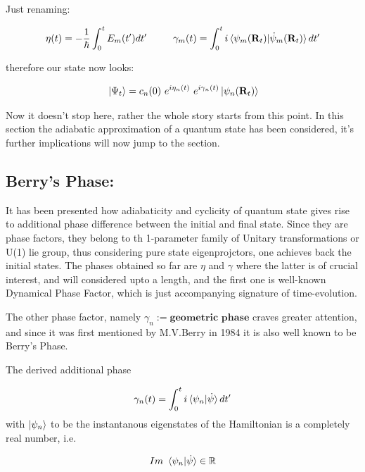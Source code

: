 \documentclass[8pt, twocoloumn]{article}
\begin{document}
Just renaming:

\begin{align}
\eta(t)=-\frac{1}{\hbar} \int^{t}_{0}E_m(t')dt'  \ \ \ \ \ \ \ \  \gamma_m(t)=\int^{t}_{0}i\braket{\psi_m(\textbf{R}_t)|\dot{\psi}_m(\textbf{R}_t)}dt'
\end{align}

therefore our state now looks: 

\begin{align}{\label{state}}
\ket{\Psi_t}=c_n(0) \ e^{i\eta_n(t)}\ e ^{i\gamma_n(t)} \ket{\psi_n(\textbf{R}_t)}
\end{align}

Now it doesn't stop here, rather the whole story starts from this point. 
In this section the adiabatic approximation of a quantum state has been considered, it's further implications will now jump to the section.

\subsection{Berry's Phase: }

It has been presented how adiabaticity and cyclicity of quantum state gives rise to additional phase difference between the initial and final state. Since they are phase factors, they belong to th 1-parameter family of Unitary transformations or U(1) lie group, thus considering pure state eigenprojctors, one achieves back the initial states. 
The phases obtained so far are $\eta$ and $\gamma$ where the latter is of crucial interest, and will considered upto a length, and the first one is well-known Dynamical Phase Factor, which is just accompanying signature of time-evolution. 

The other phase factor, namely $\gamma_n := \textbf{geometric phase}$ craves greater attention, and since it was first mentioned by M.V.Berry in 1984 \cite{berrypaper} it is also well known to be Berry's Phase.

The derived additional phase 

\begin{align}
\gamma_n(t)=\int^{t}_{0}i\braket{\psi_n|\dot{\psi}}dt'
\end{align}
with $\ket{\psi_n}$ to be the instantanous eigenstates of the Hamiltonian is a completely real number, i.e. 

\begin{align}
Im \ \braket{\psi_n|\dot{\psi}} \in \mathbb{R}
\end{align}
\end{document}
